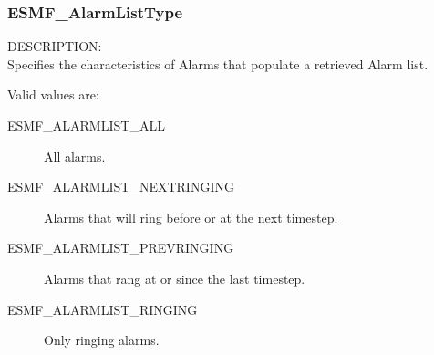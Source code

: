 
\subsubsection{ESMF\_AlarmListType}

{\sf DESCRIPTION:\\}
Specifies the characteristics of Alarms that populate
a retrieved Alarm list.

Valid values are:
\begin{description}

\item [ESMF\_ALARMLIST\_ALL] 
      All alarms.

\item [ESMF\_ALARMLIST\_NEXTRINGING] 
      Alarms that will ring before or at the next timestep.

\item [ESMF\_ALARMLIST\_PREVRINGING] 
      Alarms that rang at or since the last timestep.

\item [ESMF\_ALARMLIST\_RINGING] 
      Only ringing alarms.

\end{description}

